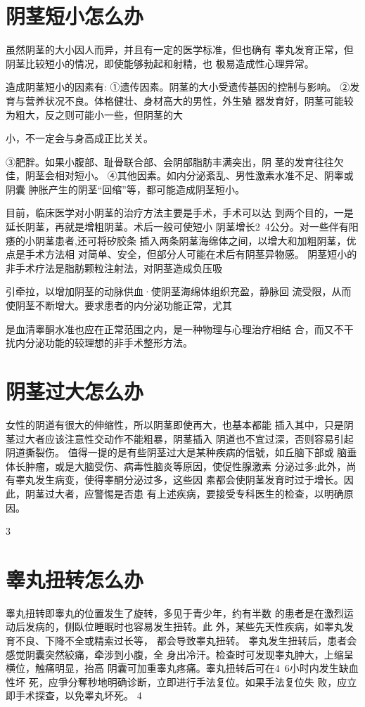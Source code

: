 \documentclass[12pt,UTF8]{ctexbook}
\begin{document}
\section{阴茎短小怎么办}
虽然阴茎的大小因人而异，并且有一定的医学标准，但也确有
睾丸发育正常，但阴茎比较短小的情况，即使能够勃起和射精，也
极易造成性心理异常。

造成阴茎短小的因素有:
①遗传因素。阴茎的大小受遗传基因的控制与影响。
②发育与营养状况不良。体格健壮、身材高大的男性，外生殖
器发育好，阴茎可能较为粗大，反之则可能小一些，但阴茎的大

小，不一定会与身高成正比关关。

③肥胖。如果小腹部、耻骨联合部、会阴部脂肪丰满突出，阴
茎的发育往往欠佳，阴茎会相对短小。
④其他因素。如内分泌紊乱、男性激素水准不足、阴睾或阴囊
肿胀产生的阴茎“回缩”等，都可能造成阴茎短小。

目前，临床医学对小阴茎的治疗方法主要是手术，手术可以达
到两个目的，一是延长阴茎，再就是增粗阴茎。术后一般可使短小
阴茎增长2~4公分。对一些伴有阳痿的小阴茎患者,还可将矽胶条
插入两条阴茎海绵体之间，以增大和加粗阴茎，优点是手术方法相
对简单、安全，但部分人可能在术后有阴茎异物感。
阴茎短小的非手术疗法是脂肪颗粒注射法，对阴茎造成负压吸

引牵拉，以增加阴茎的动脉供血·使阴茎海绵体组织充盈，静脉回
流受限，从而使阴茎不断增大。要求患者的内分泌功能正常，尤其

是血清睾酮水准也应在正常范围之内，是一种物理与心理治疗相结
合，而又不干扰内分泌功能的较理想的非手术整形方法。

\section{阴茎过大怎么办}
女性的阴道有很大的伸缩性，所以阴茎即使再大，也基本都能
插入其中，只是阴茎过大者应该注意性交动作不能粗暴，阴茎插入
阴道也不宜过深，否则容易引起阴道撕裂伤。
值得一提的是有些阴茎过大是某种疾病的信號，如丘脑下部或
脑垂体长肿瘤，或是大脑受伤、病毒性脑炎等原因，使促性腺激素
分泌过多;此外，尚有睾丸发生病变，使得睾酮分泌过多，这些因
素都会使阴茎发育时过于增长。因此，阴茎过大者，应警惕是否患
有上述疾病，要接受专科医生的检查，以明确原因。

3
\section{睾丸扭转怎么办}
睾丸扭转即睾丸的位置发生了旋转，多见于青少年，约有半数
的患者是在激烈运动后发病的，侧臥位睡眠时也容易发生扭转。此
外，某些先天性疾病，如睾丸发育不良、下降不全或精索过长等，
都会导致睾丸扭转。
睾丸发生扭转后，患者会感觉阴囊突然絞痛，牵涉到小腹，全
身出冷汗。检查时可发现睾丸肿大，上缩呈横位，触痛明显，抬高
阴囊可加重睾丸疼痛。睾丸扭转后可在4~6小时内发生缺血性坏
死，应爭分奪秒地明确诊断，立即进行手法复位。如果手法复位失
败，应立即手术探查，以免睾丸坏死。
4
\end{document}
